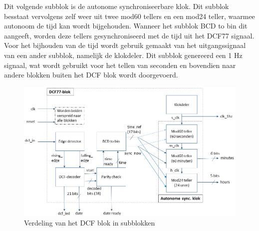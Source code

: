 \documentclass[a4paper, twoside, 10pt]{article}
\begin{document}
\noindent Dit volgende subblok is de autonome synchroniseerbare klok. Dit subblok besstaat vervolgens zelf weer uit twee mod60 tellers en een mod24 teller, waarmee autonoom de tijd kan wordt bijgehouden. Wanneer het subblok BCD to bin dit aangeeft, worden deze tellers gesynchroniseerd met de tijd uit het DCF77 signaal. Voor het bijhouden van de tijd wordt gebruik gemaakt van het uitgangssignaal van een ander subblok, namelijk de klokdeler. Dit subblok genereerd een 1 Hz signaal, wat wordt gebruikt voor het tellen van seconden en bovendien naar andere blokken buiten het DCF blok wordt doorgevoerd.

\begin{figure}[ht]
\begin{center}
\includegraphics[keepaspectratio=true,scale=0.65]{Blokschema_DCF__Top-level_.png}
\caption{Verdeling van het DCF blok in subblokken}
\label{fig: dcf_subblokken}
\end{center}
\end{figure}
\end{document}
